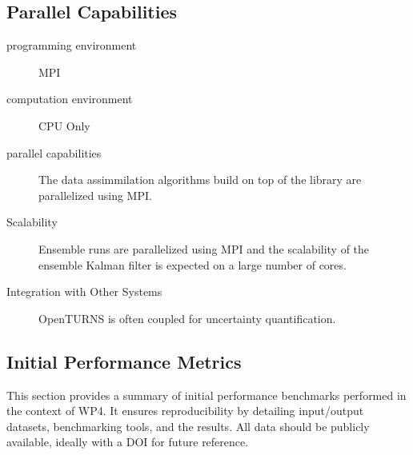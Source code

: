 \subsection{Parallel Capabilities}
\label{sec:WP4:Feel++:performances}


\begin{description}
    \item[programming environment] MPI
    \item[computation environment] CPU Only
    \item[parallel capabilities] The data assimmilation algorithms build on top of the \Feelpp library are parallelized using MPI.
    \item[Scalability] Ensemble runs are parallelized using MPI and the scalability of the ensemble Kalman filter is expected on a large number of cores.
    \item[Integration with Other Systems] OpenTURNS is often coupled for uncertainty quantification.
\end{description}

\subsection{Initial Performance Metrics}
\label{sec:WP4:Feel++:metrics}

This section provides a summary of initial performance benchmarks performed in the context of WP4. It ensures reproducibility by detailing input/output datasets, benchmarking tools, and the results. All data should be publicly available, ideally with a DOI for future reference.

